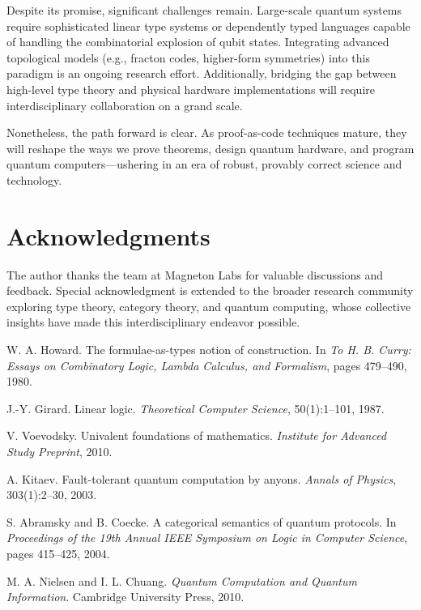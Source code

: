 \documentclass[12pt]{article}
\begin{document}
\begin{itemize}[label=$\bullet$]
Despite its promise, significant challenges remain. Large-scale quantum systems require sophisticated linear type systems or dependently typed languages capable of handling the combinatorial explosion of qubit states. Integrating advanced topological models (e.g., fracton codes, higher-form symmetries) into this paradigm is an ongoing research effort. Additionally, bridging the gap between high-level type theory and physical hardware implementations will require interdisciplinary collaboration on a grand scale.

Nonetheless, the path forward is clear. As proof-as-code techniques mature, they will reshape the ways we prove theorems, design quantum hardware, and program quantum computers—ushering in an era of robust, provably correct science and technology.

\section*{Acknowledgments}
The author thanks the team at Magneton Labs for valuable discussions and feedback. Special acknowledgment is extended to the broader research community exploring type theory, category theory, and quantum computing, whose collective insights have made this interdisciplinary endeavor possible.


\begin{thebibliography}{99}

W. A. Howard.
\newblock The formulae-as-types notion of construction.
\newblock In \emph{To H. B. Curry: Essays on Combinatory Logic, Lambda Calculus, and Formalism}, pages 479--490, 1980.

J.-Y. Girard.
\newblock Linear logic.
\newblock \emph{Theoretical Computer Science}, 50(1):1--101, 1987.

V. Voevodsky.
\newblock Univalent foundations of mathematics.
\newblock \emph{Institute for Advanced Study Preprint}, 2010.

A. Kitaev.
\newblock Fault-tolerant quantum computation by anyons.
\newblock \emph{Annals of Physics}, 303(1):2--30, 2003.

S. Abramsky and B. Coecke.
\newblock A categorical semantics of quantum protocols.
\newblock In \emph{Proceedings of the 19th Annual IEEE Symposium on Logic in Computer Science}, pages 415--425, 2004.

M. A. Nielsen and I. L. Chuang.
\newblock \emph{Quantum Computation and Quantum Information}.
\newblock Cambridge University Press, 2010.


\end{thebibliography}
\end{itemize}
\end{document}
